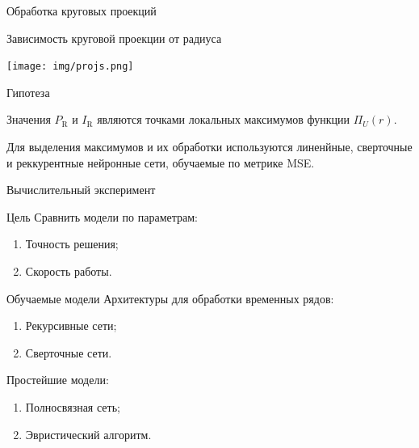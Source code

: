 \documentclass{beamer}
\begin{document}
\begin{frame}{Обработка круговых проекций}

\begin{block}{Зависимость круговой проекции от радиуса}
\begin{center}
\texttt{[image: img/projs.png]}
\end{center}
\end{block}
\vspace{-0.5cm}
\begin{block}{Гипотеза}

Значения $P_\text{R}$ и $I_\text{R}$ являются точками локальных максимумов функции $\Pi_U(r)$.

\end{block}

\bigskip

Для выделения максимумов и их обработки используются линенйные, сверточные и реккурентные нейронные сети, обучаемые по метрике MSE.

\end{frame}

\begin{frame}{Вычислительный эксперимент}

\begin{block}{Цель}
Сравнить модели по параметрам:
\begin{enumerate}
		\item Точность решения;
		\item Скорость работы.
\end{enumerate}
\end{block}

\begin{block}{Обучаемые модели}
Архитектуры для обработки временных рядов:
\begin{enumerate}
		\item Рекурсивные сети;
		\item Сверточные сети.
\end{enumerate}
Простейшие модели:
\begin{enumerate}
		\item Полносвязная сеть;
		\item Эвристический алгоритм.
\end{enumerate}
\end{block}

\end{frame}
\end{document}
